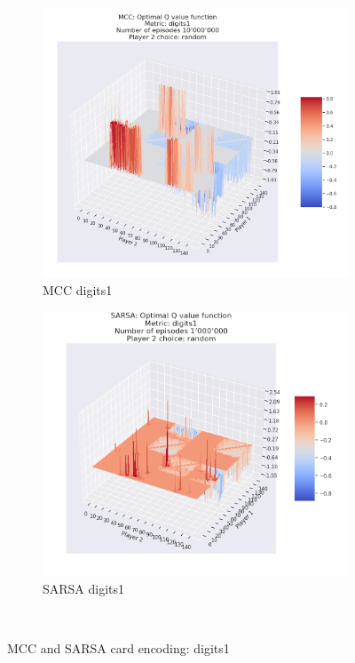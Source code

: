 \begin{figure}[ht!]
    \begin{subfigure}{0.5\textwidth}
        \includegraphics[width=1\linewidth]{Figures/mcc_digits1_10000000_random} 
        \caption[MCC digits1]{MCC digits1}
        \label{fig:mcc digits1}
    \end{subfigure}
    \begin{subfigure}{0.5\textwidth}
        \includegraphics[width=1\linewidth]{Figures/SARSA_digits1_1000000_random}
        \caption[SARSA digits1]{SARSA digits1}
        \label{fig:sarsa digits1}
    \end{subfigure} \\
    \caption{MCC and SARSA card encoding: digits1}
\label{fig:MCC and SARSA card encoding: digits1}
\end{figure}

